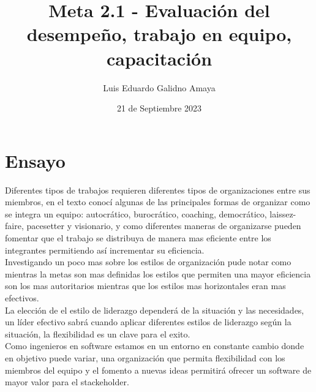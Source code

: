 \documentclass[11pt]{article}
\author{Luis Eduardo Galidno Amaya}
\date{21 de Septiembre 2023}
\title{Meta 2.1 - Evaluación del desempeño, trabajo en equipo, capacitación}
\begin{document}

\section{Ensayo}
\label{sec:orgf9fcc46}
Diferentes tipos de trabajos requieren diferentes tipos de organizaciones entre sus miembros, en el texto conocí algunas de las principales formas de organizar como se integra un equipo: autocrático, burocrático, coaching, democrático, laissez-faire,  pacesetter y visionario, y como diferentes maneras de organizarse pueden fomentar que el trabajo se distribuya de manera mas eficiente entre los integrantes permitiendo así incrementar su eficiencia.\\

Investigando un poco mas sobre los estilos de organización pude notar como mientras la metas son mas definidas los estilos que permiten una mayor eficiencia son los mas autoritarios mientras que los estilos mas horizontales eran mas efectivos. \\

La elección de el estilo de liderazgo dependerá de la situación y las necesidades, un líder efectivo sabrá cuando aplicar diferentes estilos de liderazgo según la situación, la flexibilidad es un clave para el exito. \\

Como ingenieros en software estamos en un entorno en constante cambio donde en objetivo puede variar, una organización que permita flexibilidad con los miembros del equipo y el fomento a nuevas ideas permitirá ofrecer un software de mayor valor para el stackeholder.
\end{document}
